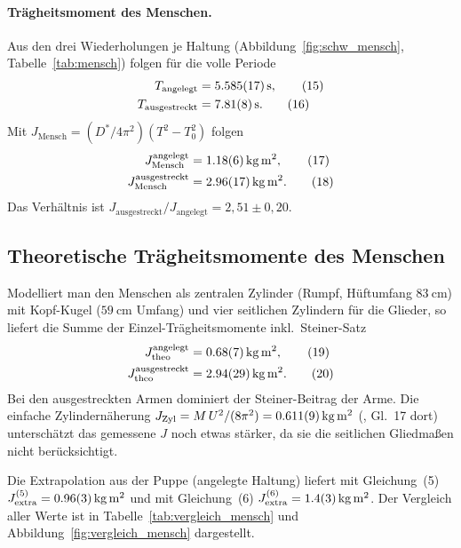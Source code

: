 \documentclass[11pt,a4paper]{article}
\begin{document}
\paragraph{Trägheitsmoment des Menschen.}
Aus den drei Wiederholungen je Haltung
(Abbildung~\ref{fig:schw_mensch}, Tabelle~\ref{tab:mensch}) folgen
für die volle Periode
\begin{align}
  T_{\mathrm{angelegt}}    &= \SI{5{,}585(17)}{\second}, \tag{15}\\
  T_{\mathrm{ausgestreckt}} &= \SI{7{,}81(8)}{\second}. \tag{16}
\end{align}
Mit $J_{\mathrm{Mensch}}=(D^{*}/4\pi^{2})(T^{2}-T_{0}^{2})$ folgen
\begin{align}
  J_{\mathrm{Mensch}}^{\text{angelegt}}    &= \SI{1{,}18(6)}{\kilogram\metre\squared}, \tag{17}\\
  J_{\mathrm{Mensch}}^{\text{ausgestreckt}} &= \SI{2{,}96(17)}{\kilogram\metre\squared}. \tag{18}
\end{align}
Das Verhältnis ist
$J_{\text{ausgestreckt}}/J_{\text{angelegt}} = 2{,}51 \pm 0{,}20$.

\subsection{Theoretische Trägheitsmomente des Menschen}
Modelliert man den Menschen als zentralen Zylinder (Rumpf,
Hüftumfang $\SI{83}{\centi\metre}$) mit Kopf-Kugel
($\SI{59}{\centi\metre}$ Umfang) und vier seitlichen Zylindern
für die Glieder, so liefert die Summe der Einzel-Trägheitsmomente
inkl.\ Steiner-Satz
\begin{align}
  J_{\mathrm{theo}}^{\text{angelegt}}    &= \SI{0{,}68(7)}{\kilogram\metre\squared}, \tag{19}\\
  J_{\mathrm{theo}}^{\text{ausgestreckt}} &= \SI{2{,}94(29)}{\kilogram\metre\squared}. \tag{20}
\end{align}
Bei den ausgestreckten Armen dominiert der Steiner-Beitrag der
Arme. Die einfache Zylindernäherung
$J_{\mathrm{Zyl}} = M\,U^{2}/(8\pi^{2}) = \SI{0{,}611(9)}{\kilogram\metre\squared}$
(\cite{anleitung}, Gl.~17 dort) unterschätzt das gemessene $J$
noch etwas stärker, da sie die seitlichen Gliedmaßen nicht
berücksichtigt.

Die Extrapolation aus der Puppe (angelegte Haltung) liefert mit
Gleichung~(5)
$J_{\text{extra}}^{(5)} = \SI{0{,}96(3)}{\kilogram\metre\squared}$ und
mit Gleichung~(6)
$J_{\text{extra}}^{(6)} = \SI{1{,}4(3)}{\kilogram\metre\squared}$.
Der Vergleich aller Werte ist in
Tabelle~\ref{tab:vergleich_mensch} und
Abbildung~\ref{fig:vergleich_mensch} dargestellt.
\end{document}
